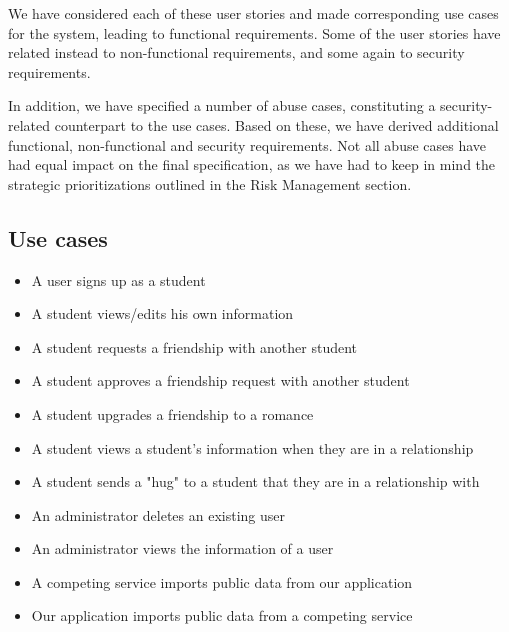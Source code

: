 \documentclass[a4paper]{article}
\begin{document}
We have considered each of these user stories and made corresponding use cases for the system, leading to functional requirements. Some of the user stories have related instead to non-functional requirements, and some again to security requirements.

In addition, we have specified a number of abuse cases, constituting a security-related counterpart to the use cases. Based on these, we have derived additional functional, non-functional and security requirements. Not all abuse cases have had equal impact on the final specification, as we have had to keep in mind the strategic prioritizations outlined in the Risk Management section.

\subsection{Use cases}
\begin{itemize}
\item A user signs up as a student
\item A student views/edits his own information
\item A student requests a friendship with another student
\item A student approves a friendship request with another student
\item A student upgrades a friendship to a romance
\item A student views a student’s information when they are in a relationship
\item A student sends a "hug" to a student that they are in a relationship with
\item An administrator deletes an existing user
\item An administrator views the information of a user
\item A competing service imports public data from our application
\item Our application imports public data from a competing service
\end{itemize}
\end{document}
